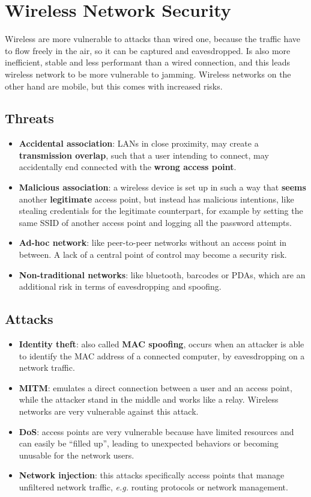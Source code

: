 \documentclass[oneside]{academica}
\begin{document}
\chapter{Wireless Network Security}

Wireless are more vulnerable to attacks than wired one, because the traffic have to flow freely in the air, so it can be captured and eavesdropped.
Is also more inefficient, stable and less performant than a wired connection, and this leads wireless network to be more vulnerable to jamming.
Wireless networks on the other hand are mobile, but this comes with increased risks.

\section{Threats}

\begin{itemize}
  \item \textbf{Accidental association}: LANs in close proximity, may create a \textbf{transmission overlap}, such that a user intending to connect, may accidentally end connected with the \textbf{wrong access point}.
  \item \textbf{Malicious association}: a wireless device is set up in such a way that \textbf{seems} another \textbf{legitimate} access point, but instead has malicious intentions, like stealing credentials for the legitimate counterpart, for example by setting the same SSID of another access point and logging all the password attempts.
  \item \textbf{Ad-hoc network}: like peer-to-peer networks without an access point in between. A lack of a central point of control may become a  security risk.
  \item \textbf{Non-traditional networks}: like bluetooth, barcodes or PDAs, which are an additional risk in terms of eavesdropping and spoofing.
\end{itemize}

\section{Attacks}

\begin{itemize}
  \item \textbf{Identity theft}: also called \textbf{MAC spoofing}, occurs when an attacker is able to identify the MAC address of a connected computer, by eavesdropping on a network traffic.
  \item \textbf{MITM}: emulates a direct connection between a user and an access point, while the attacker stand in the middle and works like a relay. Wireless networks are very vulnerable against this attack.
  \item \textbf{DoS}: access points are very vulnerable because have limited resources and can easily be ``filled up'', leading to unexpected behaviors or becoming unusable for the network users.
  \item \textbf{Network injection}: this attacks specifically access points that manage unfiltered network traffic, \textit{e.g.} routing protocols or network management.
\end{itemize}
\end{document}
